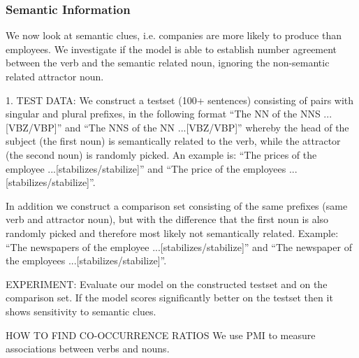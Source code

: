 \begin{multicols}{2}


\subsubsection{Semantic Information}

We now look at semantic clues, i.e. companies
are more likely to produce than employees.
We investigate if the model is able to establish
number agreement between the verb and the semantic related noun,
ignoring the non-semantic related attractor noun.
  
1. TEST DATA:
We construct a testset (100+ sentences) consisting of pairs with singular and plural prefixes, in the following format  
``The NN of the NNS ...[VBZ/VBP]'' and
``The NNS of the NN ...[VBZ/VBP]'' 
whereby the head of the subject (the first noun)
is semantically related to the verb, while the attractor (the second noun)
is randomly picked. An example is:
``The prices of the employee ...[stabilizes/stabilize]'' and 
``The price of the employees ...[stabilizes/stabilize]''.

In addition we construct a comparison set consisting of the same prefixes
(same verb and attractor noun),
but with the difference that the first noun is also randomly picked and
therefore most likely not semantically related. Example:
``The newspapers of the employee ...[stabilizes/stabilize]'' and 
``The newspaper of the employees ...[stabilizes/stabilize]''.


EXPERIMENT:
Evaluate our model on the constructed testset and on the comparison set.
If the model scores significantly better on the testset
then it shows sensitivity to semantic clues.


HOW TO FIND CO-OCCURRENCE RATIOS
We use PMI to measure associations between verbs and nouns.



\end{multicols}
